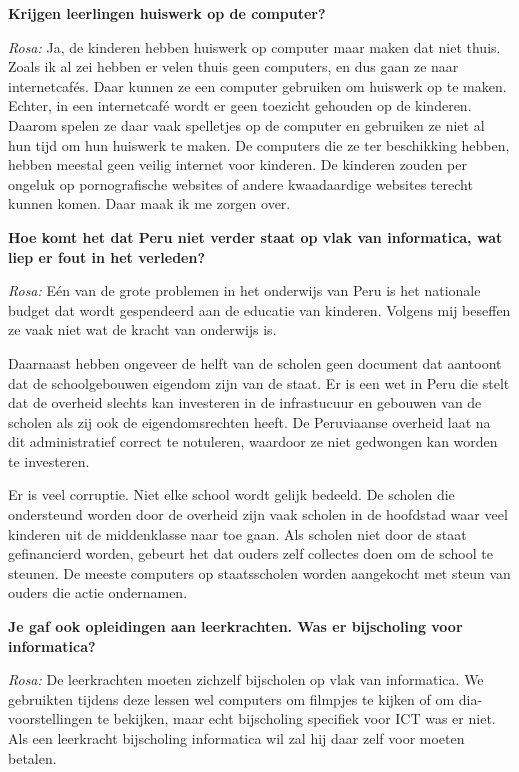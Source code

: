 \textbf{Krijgen leerlingen huiswerk op de computer?}

\textit{Rosa:} Ja, de kinderen hebben huiswerk op computer maar maken dat niet thuis. Zoals ik al zei hebben er velen thuis geen computers, en dus gaan ze naar internetcafés. Daar kunnen ze een computer gebruiken om huiswerk op te maken. Echter, in een internetcafé wordt er geen toezicht gehouden op de kinderen. Daarom spelen ze daar vaak spelletjes op de computer en gebruiken ze niet al hun tijd om hun huiswerk te maken. De computers die ze ter beschikking hebben, hebben meestal geen veilig internet voor kinderen. De kinderen zouden per ongeluk op pornografische websites of andere kwaadaardige websites terecht kunnen komen. Daar maak ik me zorgen over.

\textbf{Hoe komt het dat Peru niet verder staat op vlak van informatica, wat liep er fout in het verleden?}

\textit{Rosa:} Eén van de grote problemen in het onderwijs van Peru is het nationale budget dat wordt gespendeerd aan de educatie van kinderen. Volgens mij beseffen ze vaak niet wat de kracht van onderwijs is. 

Daarnaast hebben ongeveer de helft van de scholen geen document dat aantoont dat de schoolgebouwen eigendom zijn van de staat. Er is een wet in Peru die stelt dat de overheid slechts kan investeren in de infrastucuur en gebouwen van de scholen als zij ook de eigendomsrechten heeft. De Peruviaanse overheid laat na dit administratief correct te notuleren, waardoor ze niet gedwongen kan worden te investeren.

Er is veel corruptie. Niet elke school wordt gelijk bedeeld. De scholen die ondersteund worden door de overheid zijn vaak scholen in de hoofdstad waar veel kinderen uit de middenklasse naar toe gaan. Als scholen niet door de staat gefinancierd worden, gebeurt het dat ouders zelf collectes doen om de school te steunen. De meeste computers op staatsscholen worden aangekocht met steun van ouders die actie ondernamen. 

\textbf{Je gaf ook opleidingen aan leerkrachten. Was er bijscholing voor informatica?}

\textit{Rosa:} De leerkrachten moeten zichzelf bijscholen op vlak van informatica. We gebruikten tijdens deze lessen wel computers om filmpjes te kijken of om dia-voorstellingen te bekijken, maar echt bijscholing specifiek voor ICT was er niet. Als een leerkracht bijscholing informatica wil zal hij daar zelf voor moeten betalen.


